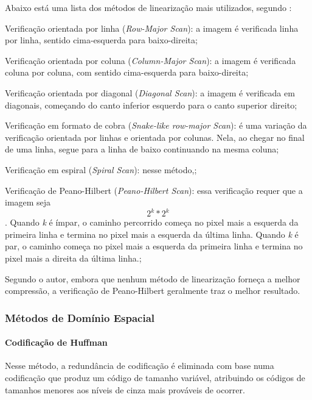 Abaixo está uma lista dos métodos de linearização mais utilizados, segundo :

\begin{alineas}
    \item Verificação orientada por linha ({\em Row-Major Scan}): a imagem é verificada linha por linha, sentido cima-esquerda para baixo-direita;
    \item Verificação orientada por coluna ({\em Column-Major Scan}): a imagem é verificada coluna por coluna, com sentido cima-esquerda para baixo-direita;
    \item Verificação orientada por diagonal ({\em Diagonal Scan}): a imagem é verificada em diagonais, começando do canto inferior esquerdo para o canto superior direito;
    \item Verificação em formato de cobra ({\em Snake-like row-major Scan}): é uma variação da verificação orientada por linhas e orientada por colunas. Nela, ao chegar no final de uma linha, segue para a linha de baixo continuando na mesma coluna;
    \item Verificação em espiral ({\em Spiral Scan}): nesse método,;
    \item Verificação de Peano-Hilbert ({\em Peano-Hilbert Scan}): essa verificação requer que a imagem seja \[ 2^k * 2^k \]. Quando {\em k} é ímpar, o caminho percorrido começa no pixel mais a esquerda da primeira linha e termina no pixel mais a esquerda da última linha. Quando {\em k} é par, o caminho começa no pixel mais a esquerda da primeira linha e termina no pixel mais a direita da última linha.;
\end{alineas}

Segundo o autor, embora que nenhum método de linearização forneça a melhor compressão, a verificação de Peano-Hilbert geralmente traz o melhor resultado.

\subsubsection{Métodos de Domínio Espacial}
\label{sss.spacialmethod}

\paragraph{Codificação de Huffman}
\label{sss.huffmancoding}

Nesse método, a redundância de codificação é eliminada com base numa codificação que produz um código de tamanho variável, atribuindo os códigos de tamanhos menores aos níveis de cinza mais prováveis de ocorrer.

